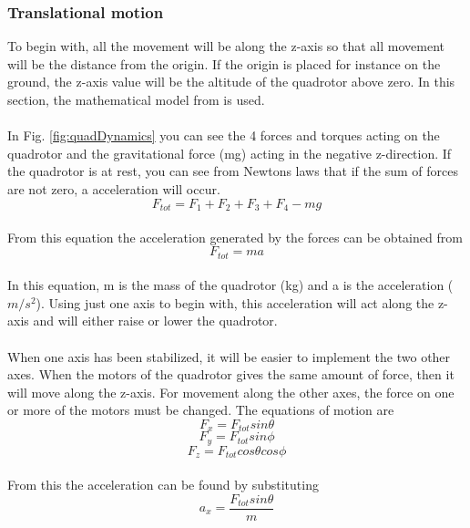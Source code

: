 \subsubsection{Translational motion}
To begin with, all the movement will be along the z-axis so that all movement will be the distance from the origin. If the origin is placed for instance on the ground, the z-axis value will be the altitude of the quadrotor above zero. In this section, the mathematical model from \cite{charlesdarwinuni} is used. 
\\\\
In Fig. \ref{fig:quadDynamics} you can see the 4 forces and torques acting on the quadrotor and the gravitational force (mg) acting in the negative z-direction. If the quadrotor is at rest, you can see from Newtons laws that if the sum of forces are not zero, a acceleration will occur. 
\begin{equation}
  F_{tot} = F_1 + F_2 + F_3 + F_4 - mg
\end{equation}
\\
From this equation the acceleration generated by the forces can be obtained from  
\\
\begin{equation}
  F_{tot} = ma
\end{equation}
\\
In this equation, m is the mass of the quadrotor (kg) and a is the acceleration ($m/s^2$). Using just one axis to begin with, this acceleration will act along the z-axis and will either raise or lower the quadrotor. 
\\\\
When one axis has been stabilized, it will be easier to implement the two other axes. When the motors of the quadrotor gives the same amount of force, then it will move along the z-axis. For movement along the other axes, the force on one or more of the motors must be changed. The equations of motion are
\\
\begin{equation}
F_x = F_{tot}sin\theta
\end{equation}
\begin{equation}
F_y = F_{tot}sin\phi
\end{equation}
\begin{equation}
F_z = F_{tot}cos\theta cos\phi
\end{equation}
\\
From this the acceleration can be found by substituting
\\
\begin{equation}
a_x = \frac{F_{tot}sin\theta}{m}
\end{equation}
